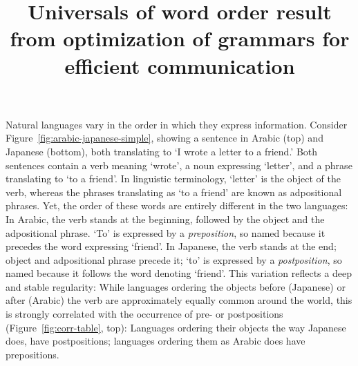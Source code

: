 \documentclass[9pt,twocolumn,twoside,lineno]{pnas-new}
\title{Universals of word order result from optimization of grammars for efficient communication}
\begin{document}
\maketitle
\thispagestyle{firststyle}

 \cite{behaghel1909beziehungen,zipf1949human,greenberg1963universals,lin2017critical} \cite{hawkins2007processing,bender2009linguistically,bender2013linguistic}




Natural languages vary in the order in which they express information.
Consider Figure~\ref{fig:arabic-japanese-simple}, showing a sentence in Arabic (top) and Japanese (bottom), both translating to `I wrote a letter to a friend.'
Both sentences contain a verb meaning `wrote', a noun expressing  `letter', and a phrase translating to `to a friend'.
In linguistic terminology, `letter' is the object of the verb, whereas the phrases translating as `to a friend' are known as adpositional phrases.
Yet, the order of these words are entirely different in the two languages:
In Arabic, the verb stands at the beginning, followed by the object and the adpositional phrase.
`To' is expressed by a \emph{preposition}, so named because it precedes the word expressing `friend'. %
In Japanese, the verb stands at the end; object and adpositional phrase precede it; `to' is expressed by a \textit{postposition}, so named because it follows the word denoting `friend'.
This variation reflects a deep and stable regularity:
While languages ordering the objects before (Japanese) or after (Arabic) the verb are approximately equally common around the world,
this is strongly correlated with the occurrence of pre- or postpositions (Figure~\ref{fig:corr-table}, top):
Languages ordering their objects the way Japanese does, have postpositions; languages ordering them as Arabic does have prepositions.
\end{document}
